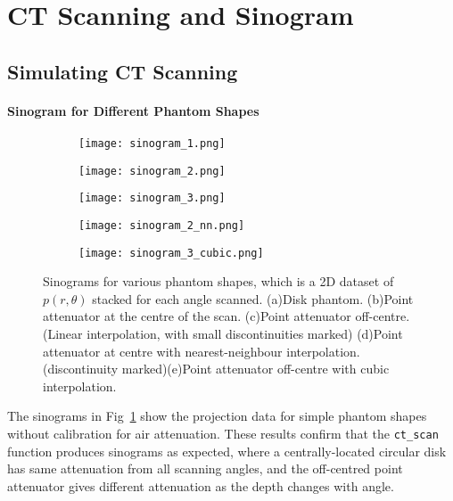 \documentclass[10pt,twocolumn]{article}
\begin{document}
\section{CT Scanning and Sinogram}
\subsection{Simulating CT Scanning}
\paragraph{Sinogram for Different Phantom Shapes}

\begin{figure}[htbp]
    \centering
    \begin{subfigure}[b]{0.3\linewidth}
        \texttt{[image: sinogram\_1.png]}
        \caption{}
    \end{subfigure}
    \begin{subfigure}[b]{0.3\linewidth}
        \texttt{[image: sinogram\_2.png]}
        \caption{}
    \end{subfigure}
    \begin{subfigure}[b]{0.3\linewidth}
        \texttt{[image: sinogram\_3.png]}
        \caption{}
    \end{subfigure}

    \begin{subfigure}[b]{0.3\linewidth}
        \texttt{[image: sinogram\_2\_nn.png]}
        \caption{}
    \end{subfigure}
    \begin{subfigure}[b]{0.3\linewidth}
        \texttt{[image: sinogram\_3\_cubic.png]}
        \caption{}
    \end{subfigure}
    \caption{Sinograms for various phantom shapes, which is a 2D dataset of $p(r, \theta)$ stacked for each angle scanned. (a)Disk phantom. (b)Point attenuator at the centre of the scan. (c)Point attenuator off-centre. (Linear interpolation, with small discontinuities marked) (d)Point attenuator at centre with nearest-neighbour interpolation. (discontinuity marked)(e)Point attenuator off-centre with cubic interpolation.}
    \label{fig:sinogram_shapes}
\end{figure}
The sinograms in Fig~\ref{fig:sinogram_shapes} show the projection data for simple phantom shapes without calibration for air attenuation. 
These results confirm that the \texttt{ct\_scan} function produces sinograms as expected, where a centrally-located circular disk has same attenuation from all scanning angles, and the off-centred point attenuator gives different attenuation as the depth changes with angle.
\end{document}
